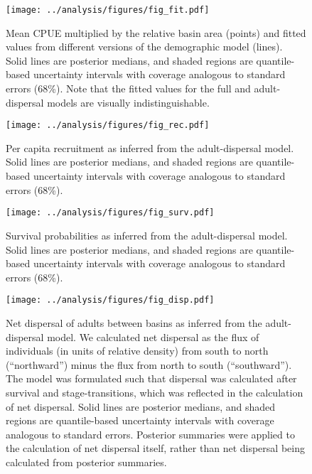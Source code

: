 \documentclass[11pt]{article}
\begin{document}
\newpage{}
\begin{figure}
\centering
\texttt{[image: ../analysis/figures/fig\_fit.pdf]}
\caption{\label{fig:fit}
Mean CPUE multiplied by the relative basin area (points)
and fitted values from different versions of the demographic model (lines).
Solid lines are posterior medians,
and shaded regions are quantile-based uncertainty intervals
with coverage analogous to standard errors (68\%).
Note that the fitted values for the full and adult-dispersal models 
are visually indistinguishable.
}
\end{figure}
\clearpage{}

\newpage{}
\begin{figure}
\centering
\texttt{[image: ../analysis/figures/fig\_rec.pdf]}
\caption{\label{fig:rec}
Per capita recruitment as inferred from the adult-dispersal model.
Solid lines are posterior medians,
and shaded regions are quantile-based uncertainty intervals
with coverage analogous to standard errors (68\%).
}
\end{figure}
\clearpage{}

\newpage{}
\begin{figure}
\centering
\texttt{[image: ../analysis/figures/fig\_surv.pdf]}
\caption{\label{fig:surv}
Survival probabilities as inferred from the adult-dispersal model.
Solid lines are posterior medians,
and shaded regions are quantile-based uncertainty intervals
with coverage analogous to standard errors (68\%).
}
\end{figure}
\clearpage{}

\newpage{}
\begin{figure}
\centering
\texttt{[image: ../analysis/figures/fig\_disp.pdf]}
\caption{\label{fig:disp}
Net dispersal of adults between basins as inferred from the adult-dispersal model.
We calculated net dispersal as the flux of individuals (in units of relative density)
from south to north (``northward'') minus the flux from north to south (``southward'').
The model was formulated such that dispersal was calculated after survival and stage-transitions,
which was reflected in the calculation of net dispersal.
Solid lines are posterior medians,
and shaded regions are quantile-based uncertainty intervals
with coverage analogous to standard errors.
Posterior summaries were applied to the calculation of net dispersal itself,
rather than net dispersal being calculated from posterior summaries.
}
\end{figure}
\clearpage{}
\end{document}
